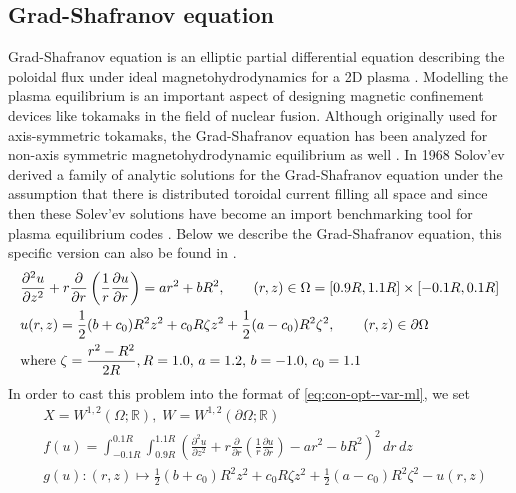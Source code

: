 \subsection{Grad-Shafranov equation} Grad-Shafranov equation is an elliptic partial differential equation describing the poloidal flux under ideal magnetohydrodynamics for a 2D plasma \cite{smithaaxisymmetric}.  Modelling the plasma equilibrium is an important aspect of designing magnetic confinement devices like tokamaks in the field of nuclear fusion. Although originally used for axis-symmetric tokamaks, the Grad-Shafranov equation has been analyzed for non-axis symmetric magnetohydrodynamic equilibrium as well \cite{burby2020generalized}. In 1968 Solov'ev derived a family of analytic solutions for the Grad-Shafranov equation under the assumption that there is distributed toroidal
current filling all space \cite{xu2019vacuum} and since then these Solev'ev solutions have become an import benchmarking tool for plasma equilibrium codes \cite{johnson1979numerical}. Below we describe the Grad-Shafranov equation, this specific version can also be found in \cite{xu2019vacuum}. 
\begin{equation}
\begin{aligned}
    &\frac{\partial^2 u}{\partial z^2}+r\frac{\partial}{\partial r}\left(\frac{1}{r}\frac{\partial u}{\partial r}\right) =ar^2 + bR^2,\qquad (r,z)\in\Omega= [0.9R, 1.1R]\times[-0.1R, 0.1R]\\
    & u(r, z) = \frac{1}{2}(b+c_0)R^2z^2+c_0R\zeta z^2+\frac{1}{2}(a-c_0)R^2\zeta^2, \qquad (r, z)\in{\partial\Omega}\\
    &\text{\rm where }\zeta =\frac{r^2-R^2}{2R}, R=1.0,\, a = 1.2,\,b=-1.0,\, c_0=1.1
\end{aligned}
\end{equation}
In order to cast this problem into the format of \eqref{eq:con-opt--var-ml}, we set
\begin{equation}
\begin{aligned}
    &X = W^{1,2}(\Omega;\mathbb R),\;W=W^{1,2}(\partial\Omega; \mathbb R)\\
    &f(u) = \int_{-0.1R}^{0.1R}\int_{0.9R}^{1.1R}\left(\frac{\partial^2 u}{\partial z^2}+r\frac{\partial}{\partial r}\left(\frac{1}{r}\frac{\partial u}{\partial r}\right) -ar^2 - bR^2\right)^2\,dr\,dz\\
    &g(u): (r,z)\mapsto \frac{1}{2}(b+c_0)R^2z^2+c_0R\zeta z^2+\frac{1}{2}(a-c_0)R^2\zeta^2 - u(r, z)
\end{aligned}\label{eq:GS--var-ml}
\end{equation}
